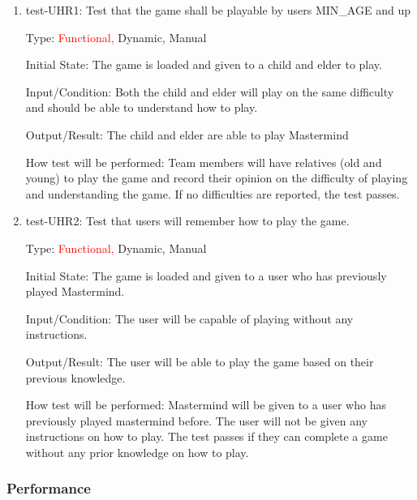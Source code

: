 \documentclass[12pt, titlepage]{article}
\begin{document}
\begin{enumerate}
    
\item{test-UHR1: Test that the game shall be playable by users MIN\_AGE and up\\}

Type: \textcolor{red}{Functional, }Dynamic, Manual
					
Initial State: The game is loaded and given to a child and elder to play.
					
Input/Condition: Both the child and elder will play on the same difficulty and should be able to understand how to play.
					
Output/Result: The child and elder are able to play Mastermind
					
How test will be performed: Team members will have relatives (old and young) to play the game and record their opinion on the difficulty of playing and understanding the game. If no difficulties are reported, the test passes.

\item{test-UHR2: Test that users will remember how to play the game.\\}

Type: \textcolor{red}{Functional, }Dynamic, Manual
					
Initial State: The game is loaded and given to a user who has previously played Mastermind.
					
Input/Condition: The user will be capable of playing without any instructions.
					
Output/Result: The user will be able to play the game based on their previous knowledge.
					
How test will be performed: Mastermind will be given to a user who has previously played mastermind before. The user will not be given any instructions on how to play. The test passes if they can complete a game without any prior knowledge on how to play.

    
\end{enumerate}

\subsubsection{Performance}
\end{document}
